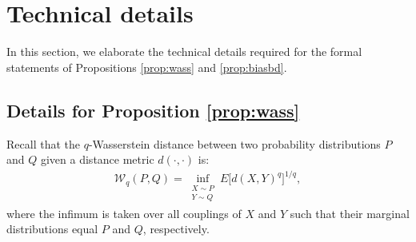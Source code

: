 \documentclass{article}
\begin{document}







\section{Technical details}

In this section, we elaborate the technical details required for the formal statements of Propositions \ref{prop:wass} and \ref{prop:biasbd}.

\subsection{Details for Proposition \ref{prop:wass}}
\label{app:wass}


Recall that the $q$-Wasserstein distance between two probability distributions $P$ and $Q$ given a distance metric $d(\cdot, \cdot)$ is:
\begin{align*}
    \mathcal{W}_q(P, Q) = \inf_{\substack{X \sim P \\ Y \sim Q}} E\big[ d(X, Y)^q \big]^{1/q},
\end{align*}
where the infimum is taken over all couplings of $X$ and $Y$ such that their marginal distributions equal $P$ and $Q$, respectively.
\end{document}
